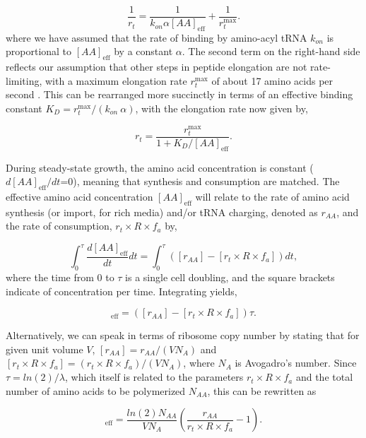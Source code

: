 \begin{equation}
\frac{1}{r_t} = \frac{1}{k_{on} \alpha [AA]_{\text{eff}}} + \frac{1}{r_{t}^{\text{max}}}.
\end{equation}
where we have assumed that the rate of binding by amino-acyl tRNA $k_{on}$ is
proportional to $[AA]_{\text{eff}}$ by a constant $\alpha$. The second term on the
right-hand side reflects our assumption that other steps in peptide elongation
are not rate-limiting, with a maximum elongation rate $r_{t}^{\text{max}}$ of
about 17 amino acids per second \cite{dai2016}. This can be rearranged more succinctly in
terms of an effective binding constant $K_D = r_{t}^{\text{max}}/ (k_{on} \ \alpha)$,
with the elongation rate now given by,

\begin{equation}
r_t = \frac{r_{t}^{\text{max}}}{1 + K_D/[AA]_{\text{eff}}}.
\label{eq:rt_kd_simple}
\end{equation}

During steady-state growth, the amino acid concentration is constant
($d[AA]_{\text{eff}}/dt$=0), meaning that synthesis and consumption are matched.
The effective amino acid concentration $[AA]_{\text{eff}}$ will relate to the rate of
amino acid synthesis (or import, for rich media) and/or tRNA charging, denoted
as $r_{AA}$,  and the rate of consumption,
$r_t\times R \times f_a$ by,

\begin{equation}
\int_{0}^{\tau} \frac{d[AA]_{\text{eff}}}{dt} dt =  \int_{0}^{\tau} ([r_{AA}] - [r_t\times R \times f_a]) dt,
\end{equation}
where the time from 0 to $\tau$ is a single cell doubling, and the square
brackets indicate of concentration per time. Integrating yields,

\begin{equation}
[AA]_{\text{eff}} =  ([r_{AA}] - [r_t \times R \times f_a]) \tau.
\label{eq:aaeff_concs}
\end{equation}

Alternatively, we can speak in terms of ribosome copy number by stating that
for given unit volume $V$, $[r_{AA}] = r_{AA}/(V N_A)$ and $[r_t\times
R\times f_a] = (r_t \times R \times f_a)/(V N_A)$, where $N_A$ is Avogadro's
number. Since $\tau = ln(2)/\lambda$, which itself is related to the
parameters $r_t\times R \times f_a$ and the total number of amino acids to be
polymerized $N_{AA}$,  this can be rewritten as

\begin{equation}
[AA]_{\text{eff}} = \frac{ln(2) N_{AA}}{V N_A} \left(\frac{r_{AA}}{r_t\times R\times f_a} - 1 \right) .
\label{eq:aa_final}
\end{equation}

